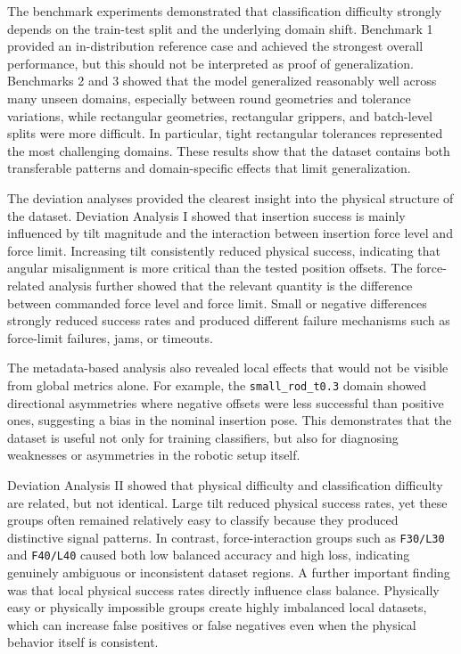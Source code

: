 The benchmark experiments demonstrated that classification difficulty strongly depends on the train-test split and the underlying domain shift. Benchmark 1 provided an in-distribution reference case and achieved the strongest overall performance, but this should not be interpreted as proof of generalization. Benchmarks 2 and 3 showed that the model generalized reasonably well across many unseen domains, especially between round geometries and tolerance variations, while rectangular geometries, rectangular grippers, and batch-level splits were more difficult. In particular, tight rectangular tolerances represented the most challenging domains. These results show that the dataset contains both transferable patterns and domain-specific effects that limit generalization.

The deviation analyses provided the clearest insight into the physical structure of the dataset. Deviation Analysis I showed that insertion success is mainly influenced by tilt magnitude and the interaction between insertion force level and force limit. Increasing tilt consistently reduced physical success, indicating that angular misalignment is more critical than the tested position offsets. The force-related analysis further showed that the relevant quantity is the difference between commanded force level and force limit. Small or negative differences strongly reduced success rates and produced different failure mechanisms such as force-limit failures, jams, or timeouts.

The metadata-based analysis also revealed local effects that would not be visible from global metrics alone. For example, the \texttt{small\_rod\_t0.3} domain showed directional asymmetries where negative offsets were less successful than positive ones, suggesting a bias in the nominal insertion pose. This demonstrates that the dataset is useful not only for training classifiers, but also for diagnosing weaknesses or asymmetries in the robotic setup itself.

Deviation Analysis II showed that physical difficulty and classification difficulty are related, but not identical. Large tilt reduced physical success rates, yet these groups often remained relatively easy to classify because they produced distinctive signal patterns. In contrast, force-interaction groups such as \texttt{F30/L30} and \texttt{F40/L40} caused both low balanced accuracy and high loss, indicating genuinely ambiguous or inconsistent dataset regions. A further important finding was that local physical success rates directly influence class balance. Physically easy or physically impossible groups create highly imbalanced local datasets, which can increase false positives or false negatives even when the physical behavior itself is consistent.

